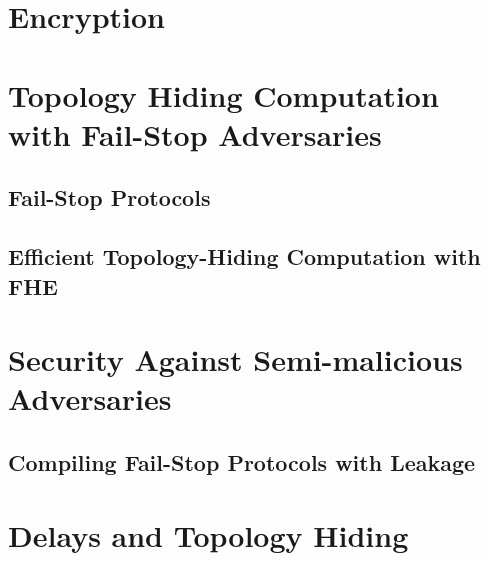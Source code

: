 \section{\schScheme Encryption}\label{app-05-pkcr-ext}


\section{Topology Hiding Computation with Fail-Stop Adversaries}

\label{sec:fs-model}

\subsection{Fail-Stop Protocols}\label{sec:FS-protocols}


\subsection{Efficient Topology-Hiding Computation with FHE}\label{sec:fhe-dopke}


\section{Security Against Semi-malicious Adversaries}\label{sec:semimal}


\subsection{Compiling Fail-Stop Protocols with Leakage}
\label{sec:composition}


\section{Delays and Topology Hiding}


